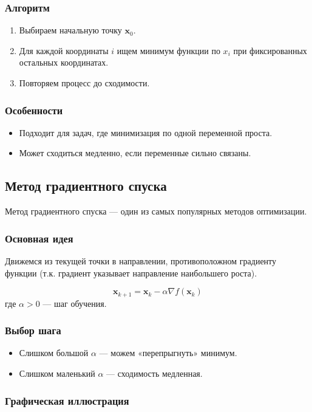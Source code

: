 \subsubsection{Алгоритм}
\begin{enumerate}
    \item Выбираем начальную точку $\mathbf{x}_0$.
    \item Для каждой координаты $i$ ищем минимум функции по $x_i$ при фиксированных остальных координатах.
    \item Повторяем процесс до сходимости.
\end{enumerate}

\subsubsection{Особенности}
\begin{itemize}
    \item Подходит для задач, где минимизация по одной переменной проста.
    \item Может сходиться медленно, если переменные сильно связаны.
\end{itemize}

\subsection{Метод градиентного спуска}
Метод градиентного спуска — один из самых популярных методов оптимизации.

\subsubsection{Основная идея}
Движемся из текущей точки в направлении, противоположном градиенту функции (т.к. градиент указывает направление наибольшего роста).

\[
\mathbf{x}_{k+1} = \mathbf{x}_k - \alpha \nabla f(\mathbf{x}_k)
\]
где $\alpha > 0$ — шаг обучения.

\subsubsection{Выбор шага}
\begin{itemize}
    \item Слишком большой $\alpha$ — можем «перепрыгнуть» минимум.
    \item Слишком маленький $\alpha$ — сходимость медленная.
\end{itemize}

\subsubsection{Графическая иллюстрация}
\begin{center}
\end{center}

